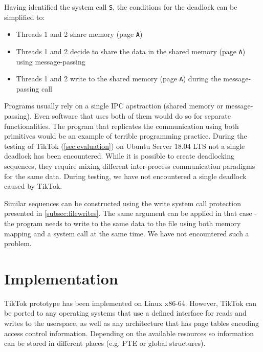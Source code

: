 Having identified the system call \texttt{S}, the conditions for the deadlock
can be simplified to:

\begin{itemize}
  \item Threads 1 and 2 share memory (page \texttt{A})
  \item Threads 1 and 2 decide to share the data in the shared memory (page
        \texttt{A}) using message-passing
  \item Threads 1 and 2 write to the shared memory (page \texttt{A}) during the
        message-passing call                       
\end{itemize}

Programs usually rely on a single IPC apstraction (shared memory or
message-passing). Even software that uses both of them would do so for separate
functionalities. The program that replicates the communication using both
primitives would be an example of terrible programming practice. During the
testing of TikTok (\cref{sec:evaluation}) on Ubuntu Server 18.04 LTS not a
single deadlock has been encountered. While it is possible to create deadlocking
sequences, they require mixing different inter-process communication paradigms
for the same data. During testing, we have not encountered a single deadlock
caused by TikTok.

Similar sequences can be constructed using the write system call protection
presented in \cref{subsec:filewrites}. The same argument can be applied in that
case - the program needs to write to the same data to the file using both memory
mapping and a system call at the same time. We have not encountered such a
problem.


\section{Implementation}
\label{sec:implementation}

TikTok prototype has been implemented on Linux x86-64. However, TikTok can be
ported to any operating systems that use a defined interface for reads and
writes to the userspace, as well as any architecture that has page tables
encoding access control information. Depending on the available resources so
information can be stored in different places (e.g. PTE or global structures).

